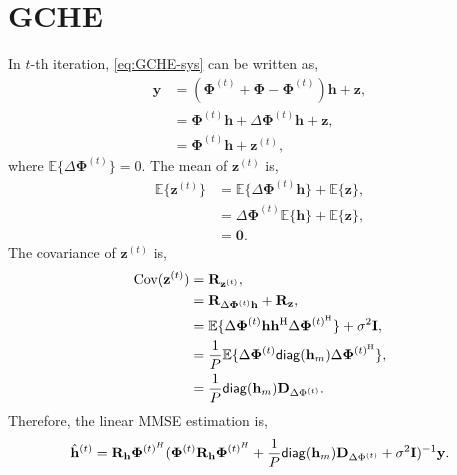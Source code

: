 \documentclass[journal]{IEEEtran}
\newcommand{\HT}{^{\mathrm{H}}} %
\newcommand{\diag}{{\sf diag}} %
\begin{document}
\section{GCHE} \label{app:GCHE}
In $t$-th iteration, \eqref{eq:GCHE-sys} can be written as,
\begin{equation}
\begin{split}
\mathbf y &= (\mathbf\Phi^{(t)} + \mathbf\Phi - \mathbf\Phi^{(t)})\mathbf h + \mathbf z, \\
&= \mathbf\Phi^{(t)}\mathbf h + \Delta\mathbf\Phi^{(t)}\mathbf h + \mathbf z, \\ 
&= \mathbf\Phi^{(t)}\mathbf h + \mathbf z^{(t)},
\end{split}
\label{eq:GCHE-sys-est-1} 
\end{equation}
where $\mathbb{E}\{\Delta\mathbf\Phi^{(t)}\}=0$.
The mean of $\mathbf z^{(t)}$ is,
\begin{equation}
\begin{split}
\mathbb{E}\{\mathbf z^{(t)}\} &= \mathbb{E}\{ \Delta\mathbf\Phi^{(t)}\mathbf h \} + \mathbb{E}\{\mathbf z \}, \\
& = \Delta\mathbf\Phi^{(t)} \mathbb{E}\{ \mathbf h \} + \mathbb{E}\{\mathbf z \}, \\
&= \mathbf 0.
\end{split}
\end{equation}
The covariance of $\mathbf z^{(t)}$ is,
\begin{equation}
\begin{split}
\text{Cov}(\mathbf z^{(t)}) &= \mathbf R_{\mathbf z^{(t)}}, \\
&= \mathbf R_{\Delta\mathbf\Phi^{(t)}\mathbf h} + \mathbf R_{\mathbf z}, \\
&= \mathbb{E}\{\Delta\mathbf\Phi^{(t)}\mathbf h \mathbf h\HT \Delta\mathbf\Phi^{(t)\HT} \} + \sigma^2\mathbf I, \\
&= \frac{1}{P} \mathbb{E}\{\Delta\mathbf\Phi^{(t)} \diag(\mathbf h_m) \Delta\mathbf\Phi^{(t)\HT} \}, \\
&= \frac{1}{P} \diag(\mathbf h_m) \mathbf D_{\Delta \Phi^{(t)}}.
\end{split}
\end{equation}
Therefore, the linear MMSE estimation is,
\begin{dmath}
\hat{\mathbf h}^{(t)} = \mathbf R_{\mathbf h}\mathbf\Phi^{(t)^H}(\mathbf \Phi^{(t)}\mathbf R_{\mathbf h}\mathbf\Phi^{(t)^H} + \frac{1}{P} \diag(\mathbf h_m) \mathbf D_{\Delta \Phi^{(t)}} +\sigma^2\mathbf I)^{-1}\mathbf y.
\end{dmath}
\end{document}
